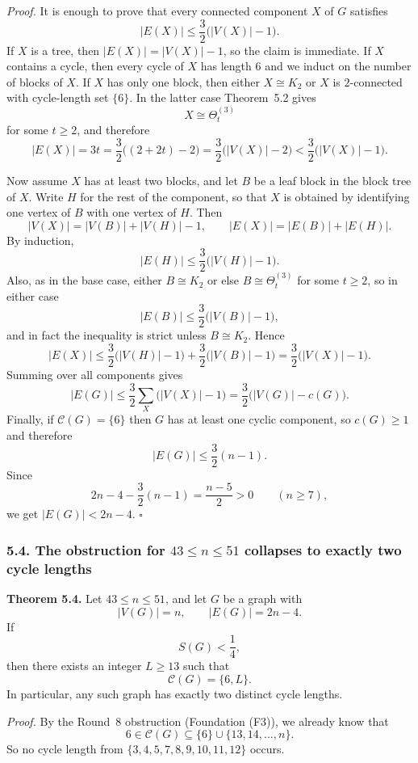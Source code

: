 \medskip
\textit{Proof.}
It is enough to prove that every connected component $X$ of $G$ satisfies
\[
|E(X)|\le \frac32\bigl(|V(X)|-1\bigr).
\]
If $X$ is a tree, then $|E(X)|=|V(X)|-1$, so the claim is immediate.
If $X$ contains a cycle, then every cycle of $X$ has length $6$ and we induct on the number of blocks of $X$.
If $X$ has only one block, then either $X\cong K_2$ or $X$ is $2$-connected with cycle-length set $\{6\}$.
In the latter case Theorem~5.2 gives
\[
X\cong \Theta_t^{(3)}
\]
for some $t\ge 2$, and therefore
\[
|E(X)|=3t=\frac32\bigl((2+2t)-2\bigr)=\frac32\bigl(|V(X)|-2\bigr)
<\frac32\bigl(|V(X)|-1\bigr).
\]

Now assume $X$ has at least two blocks, and let $B$ be a leaf block in the block tree of $X$.
Write $H$ for the rest of the component, so that $X$ is obtained by identifying one vertex of $B$ with one vertex of $H$.
Then
\[
|V(X)|=|V(B)|+|V(H)|-1,
\qquad
|E(X)|=|E(B)|+|E(H)|.
\]
By induction,
\[
|E(H)|\le \frac32\bigl(|V(H)|-1\bigr).
\]
Also, as in the base case, either $B\cong K_2$ or else $B\cong \Theta_t^{(3)}$ for some $t\ge 2$, so in either case
\[
|E(B)|\le \frac32\bigl(|V(B)|-1\bigr),
\]
and in fact the inequality is strict unless $B\cong K_2$.
Hence
\[
|E(X)|
\le \frac32\bigl(|V(H)|-1\bigr)+\frac32\bigl(|V(B)|-1\bigr)
=\frac32\bigl(|V(X)|-1\bigr).
\]
Summing over all components gives
\[
|E(G)|\le \frac32\sum_X \bigl(|V(X)|-1\bigr)=\frac32\bigl(|V(G)|-c(G)\bigr).
\]
Finally, if $\mathcal C(G)=\{6\}$ then $G$ has at least one cyclic component, so $c(G)\ge 1$ and therefore
\[
|E(G)|\le \frac32(n-1).
\]
Since
\[
2n-4-\frac32(n-1)=\frac{n-5}{2}>0
\qquad (n\ge 7),
\]
we get $|E(G)|<2n-4$. \hfill$\square$

\subsubsection*{5.4. The obstruction for $43\le n\le 51$ collapses to exactly two cycle lengths}

\textbf{Theorem 5.4.}
Let $43\le n\le 51$, and let $G$ be a graph with
\[
|V(G)|=n,
\qquad
|E(G)|=2n-4.
\]
If
\[
S(G)<\frac14,
\]
then there exists an integer $L\ge 13$ such that
\[
\mathcal C(G)=\{6,L\}.
\]
In particular, any such graph has exactly two distinct cycle lengths.

\medskip
\textit{Proof.}
By the Round~8 obstruction (Foundation (F3)), we already know that
\[
6\in \mathcal C(G)\subseteq \{6\}\cup\{13,14,\dots,n\}.
\]
So no cycle length from $\{3,4,5,7,8,9,10,11,12\}$ occurs.

